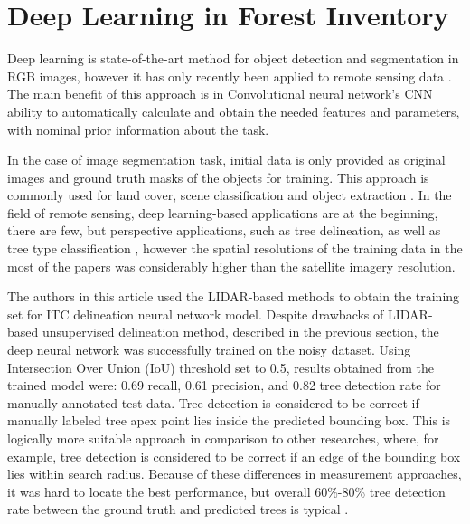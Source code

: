 \section{Deep Learning in Forest Inventory}

Deep learning is state-of-the-art method for object detection and segmentation in RGB images, however it has only recently been applied to remote sensing data \cite{Weinstein2019}. The main benefit of this approach is in Convolutional neural network's \gls{CNN} ability to automatically calculate and obtain the needed features and parameters, with nominal prior information about the task.

In the case of image segmentation task, initial data is only provided as original images and ground truth masks of the objects for training. This approach is commonly used for land cover, scene classification and object extraction \cite{Wagner2018, Wagner2019}. In the field of remote sensing, deep learning-based applications are at the beginning, there are few, but perspective applications, such as tree delineation, as well as tree type classification \cite{Li2017}, however the spatial resolutions of the training data in the most of the papers was considerably higher than the satellite imagery resolution. 

The authors in this article \cite{Weinstein2019} used the \gls{LIDAR}-based methods to obtain the training set for \gls{ITC} delineation neural network model. Despite drawbacks of \gls{LIDAR}-based unsupervised delineation method, described in the previous section, the deep neural network was successfully trained on the noisy dataset. Using Intersection Over Union (\gls{IoU}) threshold set to 0.5, results obtained from the trained model were: 0.69 recall, 0.61 precision, and 0.82 tree detection rate for manually annotated test data. Tree detection is considered to be correct if manually labeled tree apex point lies inside the predicted bounding box. This is logically more suitable approach in comparison to other researches, where, for example, tree detection is considered to be correct if an edge of the bounding box lies within search radius. Because of these differences in measurement approaches, it was hard to locate the best performance, but overall 60\%-80\% tree detection rate between the ground truth and predicted trees is typical \cite{Xiao2018, Xiao2019, Narasipura2017, Wagner2019, Khan2018, DosSantos2019, Hamraz2019, Li2017, Weinstein2019, Guirado2017}.

